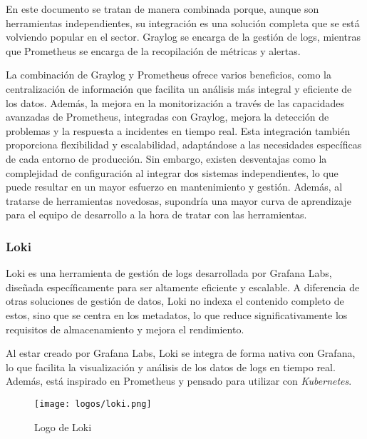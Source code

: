 En este documento se tratan de manera combinada porque, aunque son herramientas
independientes, su integración es una solución completa que se está volviendo
popular en el sector. Graylog se encarga de la gestión de logs, mientras que
Prometheus se encarga de la recopilación de métricas y alertas.

La combinación de Graylog y Prometheus ofrece varios beneficios, como la
centralización de información que facilita un análisis más integral y
eficiente de los datos. Además, la mejora en la monitorización a través de las
capacidades avanzadas de Prometheus, integradas con Graylog, mejora la detección
de problemas y la respuesta a incidentes en tiempo real. Esta integración
también proporciona flexibilidad y escalabilidad, adaptándose a las necesidades
específicas de cada entorno de producción. Sin embargo, existen desventajas como
la complejidad de configuración al integrar dos sistemas independientes, lo que
puede resultar en un mayor esfuerzo en mantenimiento y gestión. Además, al
tratarse de herramientas novedosas, supondría una mayor curva de aprendizaje
para el equipo de desarrollo a la hora de tratar con las herramientas.


\newpage{}
\subsubsection{Loki}
Loki es una herramienta de gestión de logs desarrollada por Grafana Labs,
diseñada específicamente para ser altamente eficiente y escalable. A diferencia
de otras soluciones de gestión de datos, Loki no indexa el contenido completo de
estos, sino que se centra en los metadatos, lo que reduce significativamente
los requisitos de almacenamiento y mejora el rendimiento.

Al estar creado por Grafana Labs, Loki se integra de forma nativa con Grafana,
lo que facilita la visualización y análisis de los datos de logs en tiempo real.
Además, está inspirado en Prometheus y pensado para utilizar con
\textit{Kubernetes}.

\begin{figure}[H]
	\centering
	\texttt{[image: logos/loki.png]}
	\caption{Logo de Loki~\textregistered}
\end{figure}

